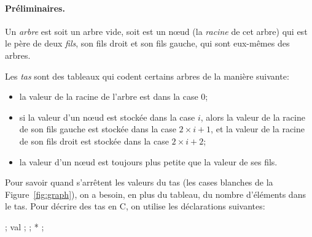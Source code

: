 
\paragraph{Pr{\'e}liminaires.}
Un \emph{arbre} est soit un arbre vide, soit est un n\oe{}ud (la
\emph{racine} de cet arbre) qui est le p{\`e}re de deux \emph{fils}, son
fils droit et son fils gauche, qui sont eux-m{\^e}mes des arbres.

Les \emph{tas} sont des tableaux qui codent certains arbres de la
mani{\`e}re suivante:
\begin{itemize}\setlength\itemsep {-3pt}
\item la valeur de la racine de l'arbre est dans la case $0$;
\item si la valeur d'un n\oe ud est stock{\'e}e dans la case $i$, alors
  la valeur de la racine de son fils gauche est stock{\'e}e dans la case
  $2\times i + 1$, et la valeur de la racine de son fils droit est
  stock{\'e}e dans la case $2\times i + 2$;
\item la valeur d'un n\oe ud est toujours plus petite que la valeur
  de ses fils.
\end{itemize}
Pour savoir quand s'arr{\^e}tent les valeurs du tas (les cases blanches de
la Figure~\ref{fig:graph}), on a besoin, en plus du tableau, du nombre
d'{\'e}l{\'e}ments dans le tas. Pour d{\'e}crire des tas en C, on utilise les
d{\'e}clarations suivantes:
\begin{Ccode}
  \ctab\cstruct {} \lb
  \ctab \cint {} ; 
  \ctab \cint * val ; 
  \ctab\rb ;
  \ctab\ctypedef \cstruct {} *  ;
\end{Ccode}


